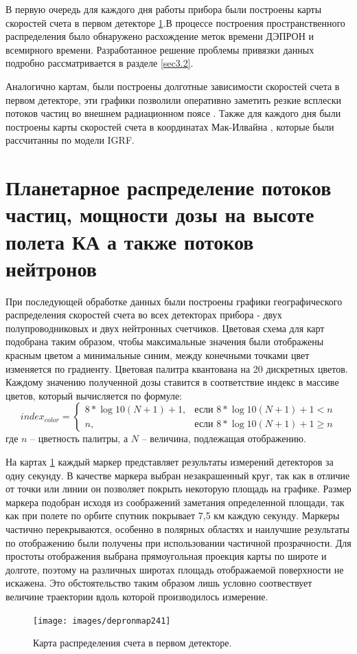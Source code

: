 В первую очередь для каждого дня работы прибора были построены карты скоростей счета в первом детекторе \ref{sec:planetDose}.В процессе построения пространственного распределения было обнаружено расхождение меток времени  ДЭПРОН и всемирного времени. Разработанное решение проблемы привязки данных подробно рассматривается в разделе \ref{sec3.2}.

Аналогично картам, были построены долготные зависимости скоростей счета в первом детекторе, эти графики позволили оперативно заметить резкие всплески потоков частиц во внешнем радиационном поясе \label{sec:flash_analisys}. Также для каждого дня были построены карты скоростей счета в координатах Мак-Илвайна \cite{McIlwain1961}, которые были рассчитанны по модели IGRF.

\section{Планетарное распределение потоков частиц, мощности дозы на высоте полета КА а также потоков нейтронов} \label{sec:planetDose}
При последующей обработке данных были построены графики географического распределения скоростей счета во всех детекторах прибора - двух полупроводниковых и двух нейтронных счетчиков. Цветовая схема для карт подобрана таким образом, чтобы максимальные значения были отображены красным цветом а минимальные синим, между конечными точками цвет изменяется по градиенту. Цветовая палитра квантована на 20 дискретных цветов. Каждому значению полученной дозы ставится в соответствие индекс в массиве цветов, который вычисляется по формуле:
\begin{equation*}
index_{color} = \begin{cases}
	8*\log{10}(N + 1)+1,  & \text{если } 8*\log{10}(N + 1) +1 < n \\
	n,  & \text{если } 8*\log{10}(N + 1) +1 \ge n
	\end{cases}
\end{equation*}
		где $ n $ -- цветность палитры, а $ N $ -- величина, подлежащая отображению.
						
%
На картах 	\ref{fig:depronmap241} каждый маркер представляет результаты измерений детекторов за одну секунду. В качестве маркера выбран незакрашенный круг, так как в отличие от точки или линии он позволяет покрыть некоторую площадь на графике. Размер маркера подобран исходя из соображений заметания определенной площади, так как  при полете по орбите спутник покрывает 7,5 км каждую секунду. Маркеры частично перекрываются, особенно в полярных областях и наилучшие результаты по отображению были получены при использовании частичной прозрачности. Для простоты отображения выбрана прямоугольная проекция карты по широте и долготе, поэтому на различных широтах площадь отображаемой поверхности не искажена. Это обстоятельство таким образом лишь условно соотвествует величине траектории вдоль которой производилось измерение.
\begin{figure}[h]
	\centering
	\texttt{[image: images/depronmap241]}
	\caption{Карта распределения счета в первом детекторе.}
	\label{fig:depronmap241}
\end{figure}

